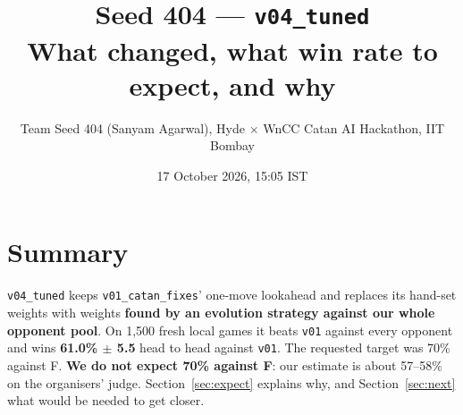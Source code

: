 \documentclass[11pt]{article}
\title{\textbf{Seed 404 --- \texttt{v04\_tuned}}\\[2pt]
\large What changed, what win rate to expect, and why}
\author{Team Seed 404 (Sanyam Agarwal), Hyde $\times$ WnCC Catan AI Hackathon, IIT Bombay}
\date{17 October 2026, 15:05 IST}
\begin{document}
\maketitle

\section*{Summary}
\texttt{v04\_tuned} keeps \texttt{v01\_catan\_fixes}' one-move lookahead and replaces its hand-set
weights with weights \textbf{found by an evolution strategy against our whole opponent pool}. On
1{,}500 fresh local games it beats \texttt{v01} against every opponent and wins
\textbf{61.0\% $\pm$ 5.5} head to head against \texttt{v01}. The requested target was 70\% against
F. \textbf{We do not expect 70\% against F}: our estimate is about 57--58\% on the organisers'
judge. Section~\ref{sec:expect} explains why, and Section~\ref{sec:next} what would be needed to
get closer.
\end{document}
